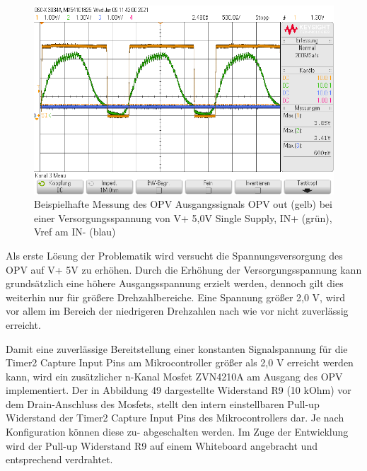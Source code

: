 \begin{figure}[H] %
\includegraphics[width=.95\textwidth]{sec4/images/inp_inref_opv_out} 
\centering
\captionsetup{width=.95\textwidth}
\caption[inp\_inref\_opv\_out]{Beispielhafte Messung des OPV Ausgangssignals OPV out (gelb) bei einer Versorgungsspannung von V+ 5,0V Single Supply,  IN+ (grün), Vref am IN- (blau)}\centering
\label{inpInrefOpvOut}
\end{figure}

Als erste Lösung der Problematik wird versucht die Spannungsversorgung des OPV auf V+ 5V zu erhöhen. Durch die Erhöhung der Versorgungsspannung kann grundsätzlich eine höhere Ausgangsspannung erzielt werden, dennoch gilt dies weiterhin nur für größere Drehzahlbereiche. Eine Spannung größer 2,0 V, wird vor allem im Bereich der niedrigeren Drehzahlen nach wie vor nicht zuverlässig erreicht.\vspace{11pt}


Damit eine zuverlässige Bereitstellung einer konstanten Signalspannung für die Timer2 Capture Input Pins am Mikrocontroller größer als 2,0 V erreicht werden kann, wird ein zusätzlicher n-Kanal Mosfet ZVN4210A am Ausgang des OPV implementiert. Der in Abbildung 49 dargestellte Widerstand R9 (10 kOhm) vor dem Drain-Anschluss des Mosfets, stellt den intern einstellbaren Pull-up Widerstand der Timer2 Capture Input Pins des Mikrocontrollers dar. Je nach Konfiguration können diese zu- abgeschalten werden. Im Zuge der Entwicklung wird der Pull-up Widerstand R9 auf einem Whiteboard angebracht und entsprechend verdrahtet.\vspace{11pt}

